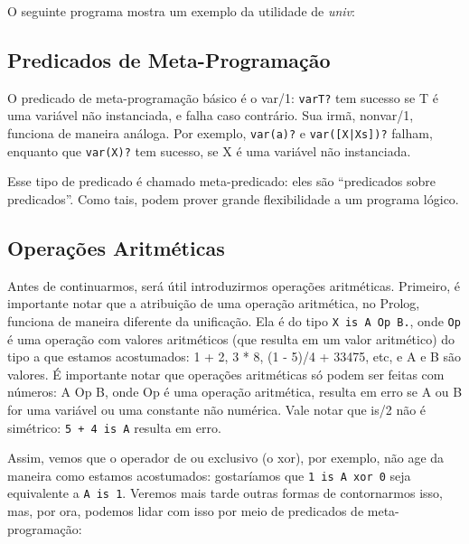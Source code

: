 \documentclass{article}
\theoremstyle{remark}
\theoremstyle{theorem}
\begin{document}
O seguinte programa mostra um exemplo da utilidade de \textit{univ}:



\subsection{Predicados de Meta-Programação}

O predicado de meta-programação básico é o var/1: {\tt var{T}?} tem sucesso se T é uma variável não instanciada, e falha caso contrário. Sua irmã, nonvar/1, funciona de maneira análoga. Por exemplo, {\tt var(a)?} e {\tt var([X|Xs])?} falham, enquanto que {\tt var(X)?} tem sucesso, se X é uma variável não instanciada.

Esse tipo de predicado é chamado meta-predicado: eles são ``predicados sobre predicados''. Como tais, podem prover grande flexibilidade a um programa lógico.


\subsection{Operações Aritméticas}


Antes de continuarmos, será útil introduzirmos operações aritméticas. Primeiro, é importante notar que a atribuição de uma operação aritmética, no Prolog, funciona de maneira diferente da unificação. Ela é do tipo {\tt X is A Op B.}, onde {\tt Op} é uma operação com valores aritméticos (que resulta em um valor aritmético) do tipo a que estamos acostumados: 1 + 2, 3 * 8, (1 - 5)/4 + 33475, etc, e A e B são valores.
É importante notar que operações aritméticas só podem ser feitas com números: A Op B, onde Op é  uma operação aritmética, resulta em erro se A ou B for uma variável ou uma constante não numérica. Vale notar que is/2 não é simétrico: {\tt 5 + 4 is A} resulta em erro.

Assim, vemos que o operador de ou exclusivo (o xor), por exemplo, não age da maneira como estamos acostumados: gostaríamos que {\tt 1 is A xor 0} seja equivalente a {\tt A is 1}.
Veremos mais tarde outras formas de contornarmos isso, mas, por ora, podemos lidar com isso por meio de predicados de meta-programação:
\\


\end{document}

